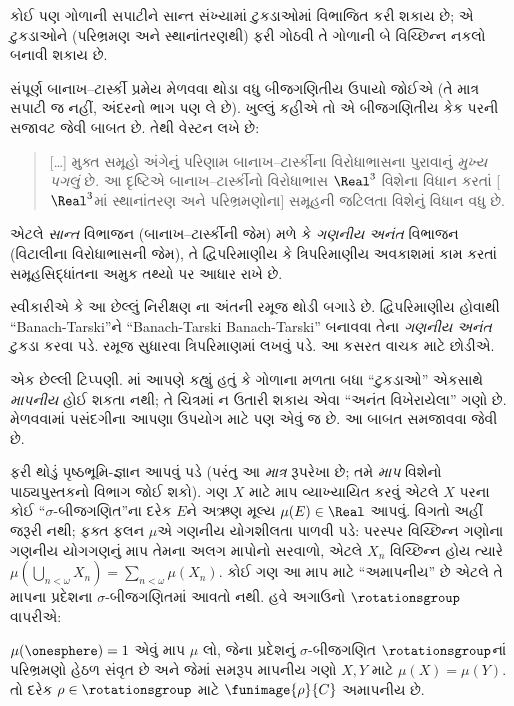 \documentclass[../../../include/open-logic-section]{subfiles}
\begin{document}
\begin{thm}
કોઈ પણ ગોળાની સપાટીને
સાન્ત સંખ્યામાં ટુકડાઓમાં
વિભાજિત કરી શકાય છે; એ
ટુકડાઓને (પરિભ્રમણ અને
સ્થાનાંતરણથી) ફરી ગોઠવી
તે ગોળાની બે વિચ્છિન્ન
નકલો બનાવી શકાય છે.
\end{thm}

સંપૂર્ણ બાનાખ--ટાર્સ્કી પ્રમેય
મેળવવા થોડા વધુ બીજગણિતીય
ઉપાયો જોઈએ (તે માત્ર સપાટી
જ નહીં, અંદરનો ભાગ પણ લે છે).
ખુલ્લું કહીએ તો એ બીજગણિતીય
કેક પરની સજાવટ જેવી બાબત છે.
તેથી વેસ્ટન લખે છે:
\begin{quote}
  [\ldots] મુક્ત સમૂહો અંગેનું
  પરિણામ બાનાખ--ટાર્સ્કીના
  વિરોધાભાસના પુરાવાનું
  \emph{મુખ્ય પગલું} છે. આ
  દૃષ્ટિએ બાનાખ--ટાર્સ્કીનો
  વિરોધાભાસ $\Real^3$ વિશેના
  વિધાન કરતાં [$\Real^3$માં
  સ્થાનાંતરણ અને પરિભ્રમણોના]
  સમૂહની જટિલતા વિશેનું
  વિધાન વધુ છે.
  \cite[p.~16]{Weston2003}
\end{quote}
એટલે \emph{સાન્ત} વિભાજન
(બાનાખ--ટાર્સ્કીની જેમ) મળે
કે \emph{ગણનીય અનંત} વિભાજન
(વિટાલીના વિરોધાભાસની જેમ),
તે દ્વિપરિમાણીય કે ત્રિપરિમાણીય
અવકાશમાં કામ કરતાં સમૂહસિદ્ધાંતના
અમુક તથ્યો પર આધાર રાખે છે.

સ્વીકારીએ કે આ છેલ્લું નિરીક્ષણ
ના અંતની
રમૂજ થોડી બગાડે છે. દ્વિપરિમાણીય
હોવાથી ``Banach-Tarski''ને
``Banach-Tarski Banach-Tarski''
બનાવવા તેના \emph{ગણનીય અનંત}
ટુકડા કરવા પડે. રમૂજ સુધારવા
ત્રિપરિમાણમાં લખવું પડે.
આ કસરત વાચક માટે છોડીએ.

એક છેલ્લી ટિપ્પણી.
માં આપણે કહ્યું
હતું કે ગોળાના મળતા બધા ``ટુકડાઓ''
એકસાથે \emph{માપનીય} હોઈ શકતા નથી;
તે ચિત્રમાં ન ઉતારી શકાય એવા
``અનંત વિખેરાયેલા'' ગણો છે.
મેળવવામાં પસંદગીના આપણા
ઉપયોગ માટે પણ એવું જ છે.
આ બાબત સમજાવવા જેવી છે.

ફરી થોડું પૃષ્ઠભૂમિ-જ્ઞાન
આપવું પડે (પરંતુ આ
\emph{માત્ર} રૂપરેખા છે; તમે
\emph{માપ} વિશેનો પાઠ્યપુસ્તકનો
વિભાગ જોઈ શકો). ગણ $X$ માટે
માપ વ્યાખ્યાયિત કરવું એટલે
$X$ પરના કોઈ ``$\sigma$-બીજગણિત''ના
દરેક $E$ને અઋણ મૂલ્ય
$\mu(E) \in \Real$ આપવું.
વિગતો અહીં જરૂરી નથી;
ફક્ત ફલન $\mu$એ ગણનીય
યોગશીલતા પાળવી પડે: પરસ્પર
વિચ્છિન્ન ગણોના ગણનીય યોગગણનું
માપ તેમના અલગ માપોનો સરવાળો,
એટલે $X_n$ વિચ્છિન્ન હોય ત્યારે
$\mu(\bigcup_{n < \omega} X_n) =
\sum_{n < \omega}\mu(X_n)$.
કોઈ ગણ આ માપ માટે ``અમાપનીય'' છે એટલે
તે માપના પ્રદેશના $\sigma$-બીજગણિતમાં આવતો નથી. હવે અગાઉનો
$\rotationsgroup$ વાપરીએ:

\begin{cor}[વિટાલી]
$\mu(\onesphere) = 1$ એવું
માપ $\mu$ લો, જેના પ્રદેશનું $\sigma$-બીજગણિત
$\rotationsgroup$નાં પરિભ્રમણો હેઠળ સંવૃત છે અને જેમાં
સમરૂપ માપનીય ગણો $X,Y$ માટે $\mu(X)=\mu(Y)$. તો દરેક
$\rho \in \rotationsgroup$ માટે
$\funimage{\rho}{C}$ અમાપનીય છે.
\end{cor}
\end{document}
